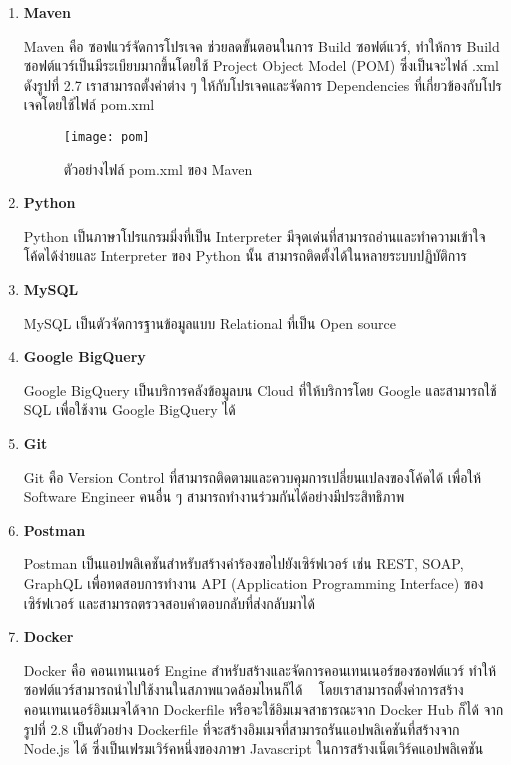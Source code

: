 \begin{enumerate}
	\item \textbf{Maven}
	
	Maven คือ ซอฟแวร์จัดการโปรเจค ช่วยลดขั้นตอนในการ Build ซอฟต์แวร์, ทำให้การ Build ซอฟต์แวร์เป็นมีระเบียบมากขึ้นโดยใช้ Project Object Model (POM) ซึ่งเป็นจะไฟล์ .xml ดังรูปที่ 2.7 เราสามารถตั้งค่าต่าง ๆ ให้กับโปรเจคและจัดการ Dependencies ที่เกี่ยวข้องกับโปรเจคโดยใช้ไฟล์ pom.xml ~\cite{maven}
	
	\begin{figure}[!h]
		\centering
		\texttt{[image: pom]}  
		\caption{ตัวอย่างไฟล์ pom.xml ของ Maven}
		\label{Fig:pom}
	\end{figure}
	
	\item \textbf{Python}
	
	Python เป็นภาษาโปรแกรมมิ่งที่เป็น Interpreter มีจุดเด่นที่สามารถอ่านและทำความเข้าใจโค้ดได้ง่ายและ Interpreter ของ Python นั้น สามารถติดตั้งได้ในหลายระบบปฏิบัติการ ~\cite{python}
		
	\item \textbf{MySQL}
	
	MySQL เป็นตัวจัดการฐานข้อมูลแบบ Relational ที่เป็น Open source ~\cite{mysql}
	
	\item \textbf{Google BigQuery}
	
	Google BigQuery เป็นบริการคลังข้อมูลบน Cloud ที่ให้บริการโดย Google และสามารถใช้ SQL เพื่อใช้งาน Google BigQuery ได้ ~\cite{bigquery}
	
	\item \textbf{Git}
	
	Git คือ Version Control ที่สามารถติดตามและควบคุมการเปลี่ยนแปลงของโค้ดได้ เพื่อให้ Software Engineer คนอื่น ๆ สามารถทำงานร่วมกันได้อย่างมีประสิทธิภาพ ~\cite{git}

	\item \textbf{Postman}
	
	Postman เป็นแอปพลิเคชันสำหรับสร้างคำร้องขอไปยังเซิร์ฟเวอร์ เช่น REST, SOAP, GraphQL เพื่อทดสอบการทำงาน API (Application Programming Interface) ของเซิร์ฟเวอร์ และสามารถตรวจสอบคำตอบกลับที่ส่งกลับมาได้ ~\cite{postman}
	
	\item \textbf{Docker}
	
	Docker คือ คอนเทนเนอร์ Engine สำหรับสร้างและจัดการคอนเทนเนอร์ของซอฟต์แวร์ ทำให้ซอฟต์แวร์สามารถนำไปใช้งานในสภาพแวดล้อมไหนก็ได้ ~\cite{docker} โดยเราสามารถตั้งค่าการสร้างคอนเทนเนอร์อิมเมจได้จาก Dockerfile หรือจะใช้อิมเมจสาธารณะจาก Docker Hub ก็ได้ จากรูปที่ 2.8 เป็นตัวอย่าง Dockerfile ที่จะสร้างอิมเมจที่สามารถรันแอปพลิเคชันที่สร้างจาก Node.js ได้ ซึ่งเป็นเฟรมเวิร์คหนึ่งของภาษา Javascript ในการสร้างเน็ตเวิร์คแอปพลิเคชัน ~\cite{nodejs}
	

\end{enumerate}
